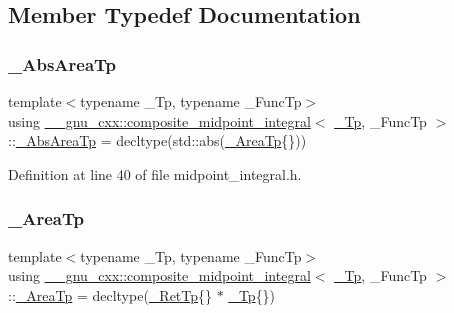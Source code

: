 \subsection{Member Typedef Documentation}
\mbox{\label{class____gnu__cxx_1_1composite__midpoint__integral_a7b1fb3ea8fc30b6099cea19948fda4a9}} 
\subsubsection{\texorpdfstring{\+\_\+\+Abs\+Area\+Tp}{\_AbsAreaTp}}
{\footnotesize\ttfamily template$<$typename \+\_\+\+Tp, typename \+\_\+\+Func\+Tp$>$ \\
using \hyperlink{class____gnu__cxx_1_1composite__midpoint__integral}{\+\_\+\+\_\+gnu\+\_\+cxx\+::composite\+\_\+midpoint\+\_\+integral}$<$ \hyperlink{namespace____gnu__cxx_a3b19a9c800ca194374ef9172290f7d79}{\+\_\+\+Tp}, \+\_\+\+Func\+Tp $>$\+::\hyperlink{class____gnu__cxx_1_1composite__midpoint__integral_a7b1fb3ea8fc30b6099cea19948fda4a9}{\+\_\+\+Abs\+Area\+Tp} =  decltype(std\+::abs(\hyperlink{class____gnu__cxx_1_1composite__midpoint__integral_a02175286c06db2fab6f727eab5117b25}{\+\_\+\+Area\+Tp}\{\}))}



Definition at line 40 of file midpoint\+\_\+integral.\+h.

\mbox{\label{class____gnu__cxx_1_1composite__midpoint__integral_a02175286c06db2fab6f727eab5117b25}} 
\subsubsection{\texorpdfstring{\+\_\+\+Area\+Tp}{\_AreaTp}}
{\footnotesize\ttfamily template$<$typename \+\_\+\+Tp, typename \+\_\+\+Func\+Tp$>$ \\
using \hyperlink{class____gnu__cxx_1_1composite__midpoint__integral}{\+\_\+\+\_\+gnu\+\_\+cxx\+::composite\+\_\+midpoint\+\_\+integral}$<$ \hyperlink{namespace____gnu__cxx_a3b19a9c800ca194374ef9172290f7d79}{\+\_\+\+Tp}, \+\_\+\+Func\+Tp $>$\+::\hyperlink{class____gnu__cxx_1_1composite__midpoint__integral_a02175286c06db2fab6f727eab5117b25}{\+\_\+\+Area\+Tp} =  decltype(\hyperlink{class____gnu__cxx_1_1composite__midpoint__integral_a092b0a129f0d5cd5f7a82d58f8117f94}{\+\_\+\+Ret\+Tp}\{\} $\ast$ \hyperlink{namespace____gnu__cxx_a3b19a9c800ca194374ef9172290f7d79}{\+\_\+\+Tp}\{\})}



